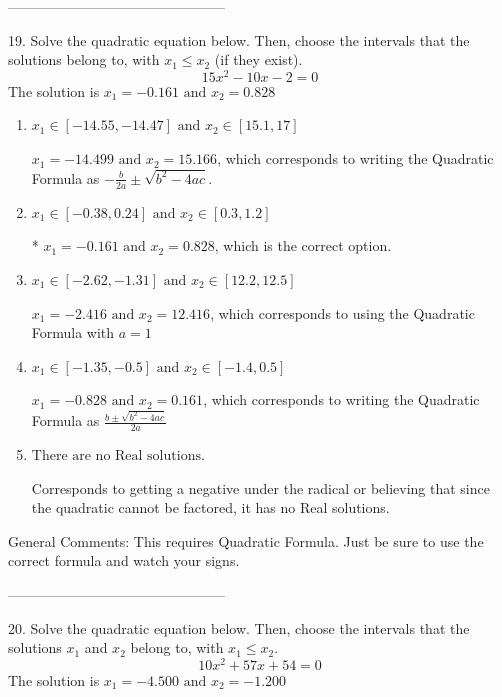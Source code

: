 \documentclass{article}[14pt]
\begin{document}
-----------------------------------------------

19. Solve the quadratic equation below. Then, choose the intervals that the solutions belong to, with $x_1 \leq x_2$ (if they exist).
$$ 15x^{2} -10 x -2 = 0 $$ 
The solution is $ x_1 = -0.161 \text{ and } x_2 = 0.828 $ 

\begin{enumerate}[label=\Alph*.] 
\item $ x_1 \in [-14.55, -14.47] \text{ and } x_2 \in [15.1, 17] $ 

  $x_1 = -14.499 \text{ and } x_2 = 15.166$, which corresponds to writing the Quadratic Formula as $-\frac{b}{2a} \pm \sqrt{b^2 - 4ac}$. 
\item $ x_1 \in [-0.38, 0.24] \text{ and } x_2 \in [0.3, 1.2] $ 

 * $x_1 = -0.161 \text{ and } x_2 = 0.828$, which is the correct option. 
\item $ x_1 \in [-2.62, -1.31] \text{ and } x_2 \in [12.2, 12.5] $ 

  $x_1 = -2.416 \text{ and } x_2 = 12.416$, which corresponds to using the Quadratic Formula with $a=1$ 
\item $ x_1 \in [-1.35, -0.5] \text{ and } x_2 \in [-1.4, 0.5] $ 

  $x_1 = -0.828 \text{ and } x_2 = 0.161$, which corresponds to writing the Quadratic Formula as $\frac{b \pm \sqrt{b^2 - 4ac}}{2a}$ 
\item $ \text{There are no Real solutions.} $ 

 Corresponds to getting a negative under the radical or believing that since the quadratic cannot be factored, it has no Real solutions. 
\end{enumerate} 
 
General Comments: This requires Quadratic Formula. Just be sure to use the correct formula and watch your signs.

-----------------------------------------------

20. Solve the quadratic equation below. Then, choose the intervals that the solutions $x_1$ and $x_2$ belong to, with $x_1 \leq x_2$.
$$ 10x^{2} +57 x + 54 = 0 $$ 
The solution is $ x_1 = -4.500 \text{ and } x_2 = -1.200 $ 
\end{document}
